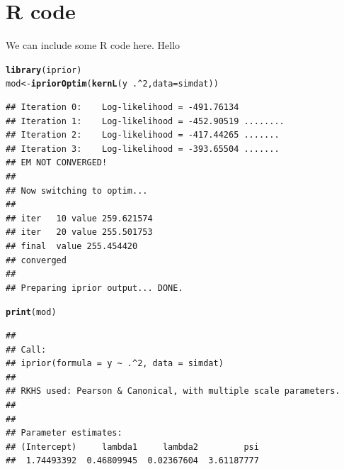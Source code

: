 \documentclass[english, 11pt]{article}\usepackage[]{graphicx}\usepackage[]{color}
\makeatletter
\newcommand{\hlnum}[1]{\textcolor[rgb]{0.686,0.059,0.569}{#1}}%
\newcommand{\hlopt}[1]{\textcolor[rgb]{0,0,0}{#1}}%
\newcommand{\hlstd}[1]{\textcolor[rgb]{0.345,0.345,0.345}{#1}}%
\newcommand{\hlkwb}[1]{\textcolor[rgb]{0.69,0.353,0.396}{#1}}%
\newcommand{\hlkwc}[1]{\textcolor[rgb]{0.333,0.667,0.333}{#1}}%
\newcommand{\hlkwd}[1]{\textcolor[rgb]{0.737,0.353,0.396}{\textbf{#1}}}%
\newenvironment{kframe}{%
 \def\at@end@of@kframe{}%
 \ifinner\ifhmode%
  \def\at@end@of@kframe{\end{minipage}}%
  \begin{minipage}{\columnwidth}%
 \fi\fi%
 \def\FrameCommand##1{\hskip\@totalleftmargin \hskip-\fboxsep
 \colorbox{shadecolor}{##1}\hskip-\fboxsep
     \hskip-\linewidth \hskip-\@totalleftmargin \hskip\columnwidth}%
 \MakeFramed {\advance\hsize-\width
   \@totalleftmargin\z@ \linewidth\hsize
   \@setminipage}}%
 {\par\unskip\endMakeFramed%
 \at@end@of@kframe}
\newenvironment{knitrout}{}{} %
\makeatother
\begin{document}
\section{R code}



We can include some R code here. Hello

\begin{knitrout}
\color{fgcolor}\begin{kframe}
\begin{alltt}
\hlkwd{library}\hlstd{(iprior)}
\hlstd{mod} \hlkwb{<-} \hlkwd{ipriorOptim}\hlstd{(}\hlkwd{kernL}\hlstd{(y} \hlopt{~} \hlstd{.} \hlopt{^} \hlnum{2}\hlstd{,} \hlkwc{data} \hlstd{= simdat))}
\end{alltt}
\begin{verbatim}
## Iteration 0:    Log-likelihood = -491.76134 
## Iteration 1:    Log-likelihood = -452.90519 ........
## Iteration 2:    Log-likelihood = -417.44265 .......
## Iteration 3:    Log-likelihood = -393.65504 .......
## EM NOT CONVERGED!
## 
## Now switching to optim...
## 
## iter   10 value 259.621574
## iter   20 value 255.501753
## final  value 255.454420 
## converged
## 
## Preparing iprior output... DONE.
\end{verbatim}
\begin{alltt}
\hlkwd{print}\hlstd{(mod)}
\end{alltt}
\begin{verbatim}
## 
## Call:
## iprior(formula = y ~ .^2, data = simdat)
## 
## RKHS used: Pearson & Canonical, with multiple scale parameters.
## 
## 
## Parameter estimates:
## (Intercept)     lambda1     lambda2         psi 
##  1.74493392  0.46809945  0.02367604  3.61187777
\end{verbatim}
\end{kframe}
\end{knitrout}
\end{document}

